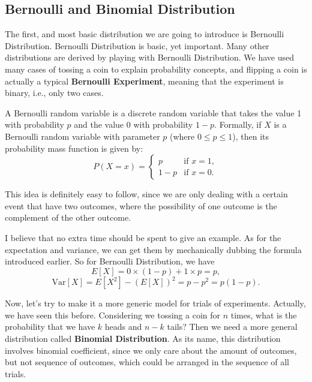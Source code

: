 \subsection{Bernoulli and Binomial Distribution}
The first, and most basic distribution we are going to introduce is Bernoulli Distribution. Bernoulli Distribution is basic, yet important. Many other distributions are derived by playing with Bernoulli Distribution. We have used many cases of tossing a coin to explain probability concepts, and flipping a coin is actually a typical \textbf{Bernoulli Experiment}, meaning that the experiment is binary, i.e., only two cases.

\begin{definition}
    A Bernoulli random variable is a discrete random variable that takes the value 1 with probability \( p \) and the value 0 with probability \( 1-p \). Formally, if \( X \) is a Bernoulli random variable with parameter \( p \) (where \( 0 \leq p \leq 1 \)), then its probability mass function is given by:
    \[
    P(X = x) = \begin{cases} 
    p & \text{if } x = 1, \\
    1-p & \text{if } x = 0.
    \end{cases}
    \]
\end{definition}

This idea is definitely easy to follow, since we are only dealing with a certain event that have two outcomes, where the possibility of one outcome is the complement of the other outcome. 

I believe that no extra time should be spent to give an example. As for the expectation and variance, we can get them by mechanically dubbing the formula introduced earlier. So for Bernoulli Distribution, we have
\begin{equation}
    E[X] = 0\times(1-p) + 1\times p = p,
\end{equation}
\begin{equation}
    \text{Var}[X] = E[X^2] - (E[X])^2 = p-p^2 = p(1-p).
\end{equation}

Now, let's try to make it a more generic model for trials of experiments. Actually, we have seen this before. Considering we tossing a coin for $n$ times, what is the probability that we have $k$ heads and $n-k$ tails? Then we need a more general distribution called \textbf{Binomial Distribution}. As its name, this distribution involves binomial coefficient, since we only care about the amount of outcomes, but not sequence of outcomes, which could be arranged in the sequence of all trials.

